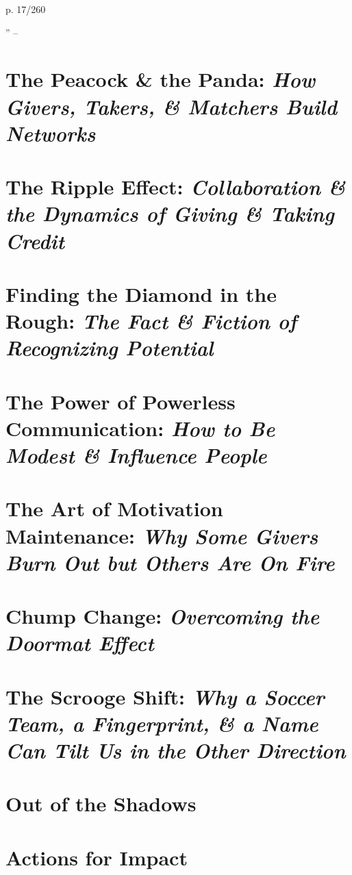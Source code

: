 \documentclass[oneside]{book}
\numberwithin{equation}{section}
\begin{document}
p. 17/260

'' -- \cite[Chap. 1]{Grant2013}

\section{The Peacock \& the Panda: \textit{How Givers, Takers, \& Matchers Build Networks}}


\section{The Ripple Effect: \textit{Collaboration \& the Dynamics of Giving \& Taking Credit}}


\section{Finding the Diamond in the Rough: \textit{The Fact \& Fiction of Recognizing Potential}}


\section{The Power of Powerless Communication: \textit{How to Be Modest \& Influence People}}


\section{The Art of Motivation Maintenance: \textit{Why Some Givers Burn Out but Others Are On Fire}}


\section{Chump Change: \textit{Overcoming the Doormat Effect}}


\section{The Scrooge Shift: \textit{Why a Soccer Team, a Fingerprint, \& a Name Can Tilt Us in the Other Direction}}


\section{Out of the Shadows}

\section{Actions for Impact}
\end{document}
